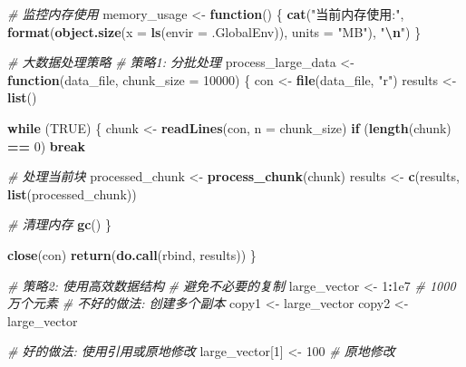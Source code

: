 \documentclass[
  twoside]{book}
\newenvironment{Shaded}{\begin{snugshade}}{\end{snugshade}}
\newcommand{\AttributeTok}[1]{\textcolor[rgb]{0.13,0.29,0.53}{#1}}
\newcommand{\CommentTok}[1]{\textcolor[rgb]{0.56,0.35,0.01}{\textit{#1}}}
\newcommand{\ConstantTok}[1]{\textcolor[rgb]{0.56,0.35,0.01}{#1}}
\newcommand{\ControlFlowTok}[1]{\textcolor[rgb]{0.13,0.29,0.53}{\textbf{#1}}}
\newcommand{\DecValTok}[1]{\textcolor[rgb]{0.00,0.00,0.81}{#1}}
\newcommand{\FloatTok}[1]{\textcolor[rgb]{0.00,0.00,0.81}{#1}}
\newcommand{\FunctionTok}[1]{\textcolor[rgb]{0.13,0.29,0.53}{\textbf{#1}}}
\newcommand{\NormalTok}[1]{#1}
\newcommand{\OtherTok}[1]{\textcolor[rgb]{0.56,0.35,0.01}{#1}}
\newcommand{\SpecialCharTok}[1]{\textcolor[rgb]{0.81,0.36,0.00}{\textbf{#1}}}
\newcommand{\StringTok}[1]{\textcolor[rgb]{0.31,0.60,0.02}{#1}}
\begin{document}
\begin{Shaded}
\begin{Highlighting}[]
\CommentTok{\# 监控内存使用}
\NormalTok{memory\_usage }\OtherTok{\textless{}{-}} \ControlFlowTok{function}\NormalTok{() \{}
  \FunctionTok{cat}\NormalTok{(}\StringTok{"当前内存使用:"}\NormalTok{, }\FunctionTok{format}\NormalTok{(}\FunctionTok{object.size}\NormalTok{(}\AttributeTok{x =} \FunctionTok{ls}\NormalTok{(}\AttributeTok{envir =}\NormalTok{ .GlobalEnv)), }\AttributeTok{units =} \StringTok{"MB"}\NormalTok{), }\StringTok{"}\SpecialCharTok{\textbackslash{}n}\StringTok{"}\NormalTok{)}
\NormalTok{\}}

\CommentTok{\# 大数据处理策略}
\CommentTok{\# 策略1: 分批处理}
\NormalTok{process\_large\_data }\OtherTok{\textless{}{-}} \ControlFlowTok{function}\NormalTok{(data\_file, }\AttributeTok{chunk\_size =} \DecValTok{10000}\NormalTok{) \{}
\NormalTok{  con }\OtherTok{\textless{}{-}} \FunctionTok{file}\NormalTok{(data\_file, }\StringTok{"r"}\NormalTok{)}
\NormalTok{  results }\OtherTok{\textless{}{-}} \FunctionTok{list}\NormalTok{()}

  \ControlFlowTok{while}\NormalTok{ (}\ConstantTok{TRUE}\NormalTok{) \{}
\NormalTok{    chunk }\OtherTok{\textless{}{-}} \FunctionTok{readLines}\NormalTok{(con, }\AttributeTok{n =}\NormalTok{ chunk\_size)}
    \ControlFlowTok{if}\NormalTok{ (}\FunctionTok{length}\NormalTok{(chunk) }\SpecialCharTok{==} \DecValTok{0}\NormalTok{) }\ControlFlowTok{break}

    \CommentTok{\# 处理当前块}
\NormalTok{    processed\_chunk }\OtherTok{\textless{}{-}} \FunctionTok{process\_chunk}\NormalTok{(chunk)}
\NormalTok{    results }\OtherTok{\textless{}{-}} \FunctionTok{c}\NormalTok{(results, }\FunctionTok{list}\NormalTok{(processed\_chunk))}

    \CommentTok{\# 清理内存}
    \FunctionTok{gc}\NormalTok{()}
\NormalTok{  \}}

  \FunctionTok{close}\NormalTok{(con)}
  \FunctionTok{return}\NormalTok{(}\FunctionTok{do.call}\NormalTok{(rbind, results))}
\NormalTok{\}}

\CommentTok{\# 策略2: 使用高效数据结构}
\CommentTok{\# 避免不必要的复制}
\NormalTok{large\_vector }\OtherTok{\textless{}{-}} \DecValTok{1}\SpecialCharTok{:}\FloatTok{1e7}  \CommentTok{\# 1000万个元素}
\CommentTok{\# 不好的做法: 创建多个副本}
\NormalTok{copy1 }\OtherTok{\textless{}{-}}\NormalTok{ large\_vector}
\NormalTok{copy2 }\OtherTok{\textless{}{-}}\NormalTok{ large\_vector}

\CommentTok{\# 好的做法: 使用引用或原地修改}
\NormalTok{large\_vector[}\DecValTok{1}\NormalTok{] }\OtherTok{\textless{}{-}} \DecValTok{100}  \CommentTok{\# 原地修改}
\end{Highlighting}
\end{Shaded}
\end{document}
